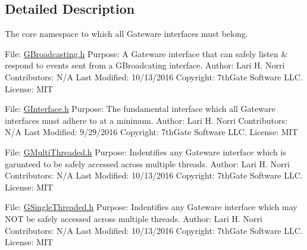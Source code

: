 \subsection{Detailed Description}
The core namespace to which all Gateware interfaces must belong.

File\+: \hyperlink{_g_broadcasting_8h_source}{G\+Broadcasting.\+h} Purpose\+: A Gateware interface that can safely listen \& respond to events sent from a G\+Broadcating interface. Author\+: Lari H. Norri Contributors\+: N/A Last Modified\+: 10/13/2016 Copyright\+: 7th\+Gate Software L\+LC. License\+: M\+IT

File\+: \hyperlink{_g_interface_8h_source}{G\+Interface.\+h} Purpose\+: The fundamental interface which all Gateware interfaces must adhere to at a minimum. Author\+: Lari H. Norri Contributors\+: N/A Last Modified\+: 9/29/2016 Copyright\+: 7th\+Gate Software L\+LC. License\+: M\+IT

File\+: \hyperlink{_g_multi_threaded_8h_source}{G\+Multi\+Threaded.\+h} Purpose\+: Indentifies any Gateware interface which is garunteed to be safely accessed across multiple threads. Author\+: Lari H. Norri Contributors\+: N/A Last Modified\+: 10/13/2016 Copyright\+: 7th\+Gate Software L\+LC. License\+: M\+IT

File\+: \hyperlink{_g_single_threaded_8h_source}{G\+Single\+Threaded.\+h} Purpose\+: Indentifies any Gateware interface which may N\+OT be safely accessed across multiple threads. Author\+: Lari H. Norri Contributors\+: N/A Last Modified\+: 10/13/2016 Copyright\+: 7th\+Gate Software L\+LC. License\+: M\+IT 